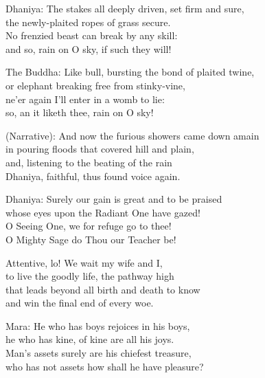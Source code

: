 \begin{MyDescription}{Dhaniya:}  	
The stakes all deeply driven, set firm and sure,\\
the newly-plaited ropes of grass secure.\\
No frenzied beast can break by any skill:\\
and so, rain on O sky, if such they will!
              \end{MyDescription}    
              
\begin{MyDescription}{The Buddha:}  	
Like bull, bursting the bond of plaited twine,\\
or elephant breaking free from stinky-vine,\\
ne'er again I'll enter in a womb to lie:\\
so, an it liketh thee, rain on O sky!
\end{MyDescription}  
   
\begin{MyDescription}{(Narrative):}  	
And now the furious showers came down amain\\
in pouring floods that covered hill and plain,\\
and, listening to the beating of the rain\\
Dhaniya, faithful, thus found voice again.
\end{MyDescription}   

\begin{MyDescription}{Dhaniya:}  	
Surely our gain is great and to be praised\\
whose eyes upon the Radiant One have gazed!\\
O Seeing One, we for refuge go to thee!\\
O Mighty Sage do Thou our Teacher be!
\end{MyDescription}     

\begin{MyDescription}{}  	
Attentive, lo! We wait my wife and I,\\
to live the goodly life, the pathway high\\
that leads beyond all birth and death to know\\
and win the final end of every woe.
\end{MyDescription}   

\begin{MyDescription}{Mara:}  	
He who has boys rejoices in his boys,\\
he who has kine, of kine are all his joys.\\
Man's assets surely are his chiefest treasure,\\
who has not assets how shall he have pleasure?\\
\end{MyDescription}   

